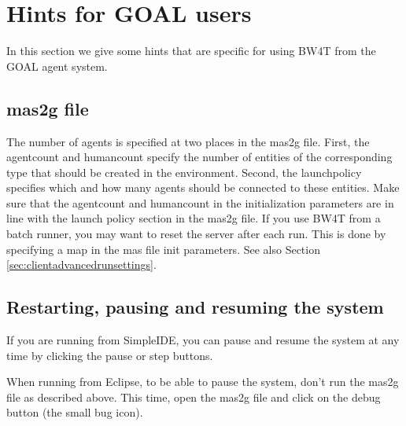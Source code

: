 \documentclass[11pt,a4paper]{article}
\begin{document}




\section{Hints for GOAL users}
In this section we give some hints that are specific for using BW4T from the GOAL agent system.

\subsection{mas2g file}
The number of agents is specified at two places in the mas2g file. First, the agentcount and humancount specify the number of entities of the corresponding type that should be created in the environment. Second, the launchpolicy specifies which and how many agents should be connected to these entities. Make sure that the agentcount and humancount in the initialization parameters are in line with the launch policy section in the mas2g file. 
If you use BW4T from a batch runner, you may want to reset the server after each run. This is done by specifying a map in the mas file init parameters. See also Section \ref{sec:clientadvancedrunsettings}.

\subsection{Restarting, pausing and resuming the system}
If you are running from SimpleIDE, you can pause and resume the system at any time by clicking the pause or step buttons. 

When running from Eclipse, to be able to pause the system, don't run the mas2g file as described above. This time, open the mas2g file and click on the debug button (the small bug icon).
\end{document}
